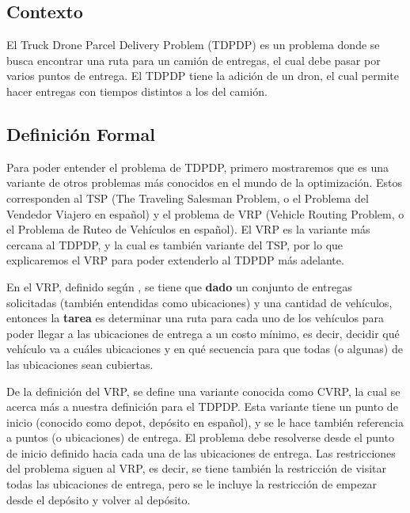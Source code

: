 
\subsection{Contexto}

El Truck Drone Parcel Delivery Problem (TDPDP) es un problema donde se busca encontrar una ruta para un camión de entregas, el cual debe pasar por varios puntos de entrega. El TDPDP tiene la adición de un dron, el cual permite hacer entregas con tiempos distintos a los del camión.

\subsection{Definición Formal}

Para poder entender el problema de TDPDP, primero mostraremos que es una variante de otros problemas más conocidos en el mundo de la optimización. Estos corresponden al TSP (The Traveling Salesman Problem, o el Problema del Vendedor Viajero en español) y el problema de VRP (Vehicle Routing Problem, o el Problema de Ruteo de Vehículos en español). El VRP es la variante más cercana al TDPDP, y la cual es también variante del TSP, por lo que explicaremos el VRP para poder extenderlo al TDPDP más adelante.

En el VRP, definido según \cite{Irnich2014FamilyVRP}, se tiene que \textbf{dado} un conjunto de entregas solicitadas (también entendidas como ubicaciones) y una cantidad de vehículos, entonces la \textbf{tarea} es determinar una ruta para cada uno de los vehículos para poder llegar a las ubicaciones de entrega a un costo mínimo, es decir, decidir qué vehículo va a cuáles ubicaciones y en qué secuencia para que todas (o algunas) de las ubicaciones sean cubiertas. 

De la definición del VRP, se define una variante conocida como CVRP, la cual se acerca más a nuestra definición para el TDPDP. Esta variante tiene un punto de inicio (conocido como depot, depósito en español), y se le hace también referencia a puntos (o ubicaciones) de entrega. El problema debe resolverse desde el punto de inicio definido hacia cada una de las ubicaciones de entrega. Las restricciones del problema siguen al VRP, es decir, se tiene también la restricción de visitar todas las ubicaciones de entrega, pero se le incluye la restricción de empezar desde el depósito y volver al depósito.

